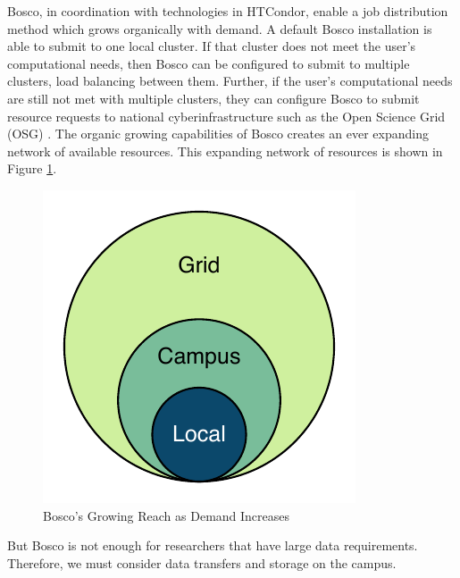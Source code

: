 Bosco, in coordination with technologies in HTCondor, enable a job distribution method which grows organically with demand.  A default Bosco installation is able to submit to one local cluster.  If that cluster does not meet the user's computational needs, then Bosco can be configured to submit to multiple clusters, load balancing between them.  Further, if the user's computational needs are still not met with multiple clusters, they can configure Bosco to submit resource requests to national cyberinfrastructure such as the Open Science Grid (OSG) \cite{pordes2007open}.  The organic growing capabilities of Bosco creates an ever expanding network of available resources. This expanding network of resources is shown in Figure \ref{fig:boscogrowing}.

\begin{figure}[ht!]
	\centering
	\includegraphics{images/BoscoGrowing.pdf}
	\caption{Bosco's Growing Reach as Demand Increases}
	\label{fig:boscogrowing}
\end{figure}



But Bosco is not enough for researchers that have large data requirements.  Therefore, we must consider data transfers and storage on the campus.





